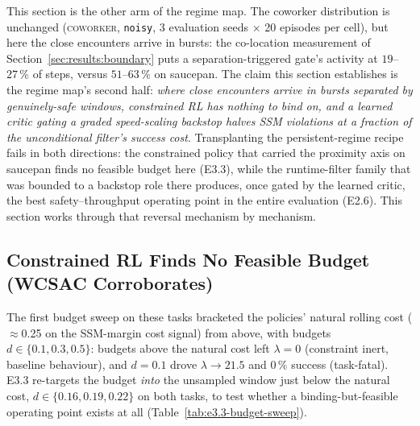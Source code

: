 \documentclass[11pt,a4paper]{report}
\newcommand{\ssm}{SSM}
\newcommand{\coworker}{\textsc{coworker}}
\begin{document}
This section is the other arm of the regime map. The coworker
distribution is unchanged (\coworker{}, \texttt{noisy}, 3 evaluation
seeds $\times$ 20 episodes per cell), but here the close encounters
arrive in bursts: the co-location measurement of
Section~\ref{sec:results:boundary} puts a separation-triggered
gate's activity at $19$--$27\,\%$ of steps, versus $51$--$63\,\%$ on
saucepan. The claim this section establishes is the regime map's
second half: \emph{where close encounters arrive in bursts separated
by genuinely-safe windows, constrained RL has nothing to bind on,
and a learned critic gating a graded speed-scaling backstop halves
\ssm{} violations at a fraction of the unconditional filter's
success cost}. Transplanting the persistent-regime recipe fails in
both directions: the constrained policy that carried the proximity
axis on saucepan finds no feasible budget here (E3.3), while the
runtime-filter family that was bounded to a backstop role there
produces, once gated by the learned critic, the best
safety--throughput operating point in the entire evaluation (E2.6).
This section works through that reversal mechanism by mechanism.

\subsection{Constrained RL Finds No Feasible Budget (WCSAC Corroborates)}
\label{sec:results:r2-lagrangian}

The first budget sweep on these tasks bracketed the policies' natural
rolling cost ($\approx$0.25 on the \ssm{}-margin cost signal) from
above, with budgets $d \in \{0.1, 0.3, 0.5\}$: budgets above the
natural cost left $\lambda = 0$ (constraint inert, baseline
behaviour), and $d = 0.1$ drove $\lambda \to 21.5$ and $0\,\%$
success (task-fatal). E3.3 re-targets the budget \emph{into} the
unsampled window just below the natural cost,
$d \in \{0.16, 0.19, 0.22\}$ on both tasks, to test whether a
binding-but-feasible operating point exists at all
(Table~\ref{tab:e3.3-budget-sweep}).
\end{document}
